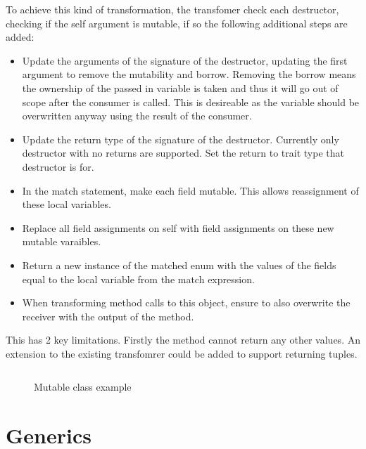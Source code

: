 \documentclass[ oneside,%
                    author={James Elgar},
                    degree={MEng},
                     title={Bidirectional transformer between functional and \\ object-oriented programming in Rust},
                  subtitle={}]{dissertation}
\newcommand{\codefile}[2]{\inputminted[xleftmargin=20pt,linenos, breaklines]{#1}{#2}}
\newcommand{\rustfile}[1]{\codefile{rust}{../#1.rs}}
\newcommand{\rustexample}[1]{\rustfile{examples/src/#1}}
\begin{document}
To achieve this kind of transformation, the transfomer check each destructor, checking if the self argument is mutable, if so the following additional steps are added:

\begin{itemize}
    \item Update the arguments of the signature of the destructor, updating the first argument to remove the mutability and borrow. Removing the borrow means the ownership of the passed in variable is taken and thus it will go out of scope after the consumer is called. This is desireable as the variable should be overwritten anyway using the result of the consumer. 
    \item Update the return type of the signature of the destructor. Currently only destructor with no returns are supported. Set the return to trait type that destructor is for.
    \item In the match statement, make each field mutable. This allows reassignment of these local variables.
    \item Replace all field assignments on self with field assignments on these new mutable varaibles. 
    \item Return a new instance of the matched enum with the values of the fields equal to the local variable from the match expression. 
    \item When transforming method calls to this object, ensure to also overwrite the receiver with the output of the method.
\end{itemize}

This has 2 key limitations. Firstly the method cannot return any other values. An extension to the existing transfomrer could be added to support returning tuples.



\begin{figure}
\centering
\rustexample{mutable/oop-basic}
\caption{Mutable class example}
\label{fig:mutable-example}
\end{figure}

\section{Generics}


\end{document}
